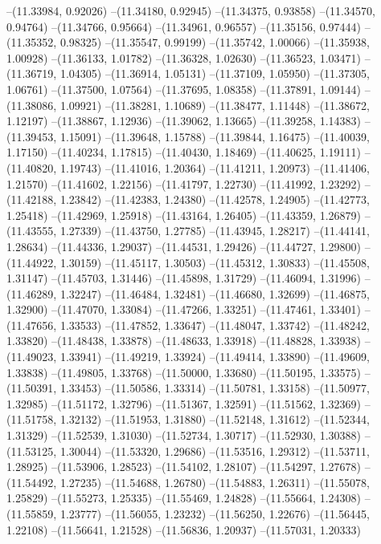 --(11.33984, 0.92026)
--(11.34180, 0.92945)
--(11.34375, 0.93858)
--(11.34570, 0.94764)
--(11.34766, 0.95664)
--(11.34961, 0.96557)
--(11.35156, 0.97444)
--(11.35352, 0.98325)
--(11.35547, 0.99199)
--(11.35742, 1.00066)
--(11.35938, 1.00928)
--(11.36133, 1.01782)
--(11.36328, 1.02630)
--(11.36523, 1.03471)
--(11.36719, 1.04305)
--(11.36914, 1.05131)
--(11.37109, 1.05950)
--(11.37305, 1.06761)
--(11.37500, 1.07564)
--(11.37695, 1.08358)
--(11.37891, 1.09144)
--(11.38086, 1.09921)
--(11.38281, 1.10689)
--(11.38477, 1.11448)
--(11.38672, 1.12197)
--(11.38867, 1.12936)
--(11.39062, 1.13665)
--(11.39258, 1.14383)
--(11.39453, 1.15091)
--(11.39648, 1.15788)
--(11.39844, 1.16475)
--(11.40039, 1.17150)
--(11.40234, 1.17815)
--(11.40430, 1.18469)
--(11.40625, 1.19111)
--(11.40820, 1.19743)
--(11.41016, 1.20364)
--(11.41211, 1.20973)
--(11.41406, 1.21570)
--(11.41602, 1.22156)
--(11.41797, 1.22730)
--(11.41992, 1.23292)
--(11.42188, 1.23842)
--(11.42383, 1.24380)
--(11.42578, 1.24905)
--(11.42773, 1.25418)
--(11.42969, 1.25918)
--(11.43164, 1.26405)
--(11.43359, 1.26879)
--(11.43555, 1.27339)
--(11.43750, 1.27785)
--(11.43945, 1.28217)
--(11.44141, 1.28634)
--(11.44336, 1.29037)
--(11.44531, 1.29426)
--(11.44727, 1.29800)
--(11.44922, 1.30159)
--(11.45117, 1.30503)
--(11.45312, 1.30833)
--(11.45508, 1.31147)
--(11.45703, 1.31446)
--(11.45898, 1.31729)
--(11.46094, 1.31996)
--(11.46289, 1.32247)
--(11.46484, 1.32481)
--(11.46680, 1.32699)
--(11.46875, 1.32900)
--(11.47070, 1.33084)
--(11.47266, 1.33251)
--(11.47461, 1.33401)
--(11.47656, 1.33533)
--(11.47852, 1.33647)
--(11.48047, 1.33742)
--(11.48242, 1.33820)
--(11.48438, 1.33878)
--(11.48633, 1.33918)
--(11.48828, 1.33938)
--(11.49023, 1.33941)
--(11.49219, 1.33924)
--(11.49414, 1.33890)
--(11.49609, 1.33838)
--(11.49805, 1.33768)
--(11.50000, 1.33680)
--(11.50195, 1.33575)
--(11.50391, 1.33453)
--(11.50586, 1.33314)
--(11.50781, 1.33158)
--(11.50977, 1.32985)
--(11.51172, 1.32796)
--(11.51367, 1.32591)
--(11.51562, 1.32369)
--(11.51758, 1.32132)
--(11.51953, 1.31880)
--(11.52148, 1.31612)
--(11.52344, 1.31329)
--(11.52539, 1.31030)
--(11.52734, 1.30717)
--(11.52930, 1.30388)
--(11.53125, 1.30044)
--(11.53320, 1.29686)
--(11.53516, 1.29312)
--(11.53711, 1.28925)
--(11.53906, 1.28523)
--(11.54102, 1.28107)
--(11.54297, 1.27678)
--(11.54492, 1.27235)
--(11.54688, 1.26780)
--(11.54883, 1.26311)
--(11.55078, 1.25829)
--(11.55273, 1.25335)
--(11.55469, 1.24828)
--(11.55664, 1.24308)
--(11.55859, 1.23777)
--(11.56055, 1.23232)
--(11.56250, 1.22676)
--(11.56445, 1.22108)
--(11.56641, 1.21528)
--(11.56836, 1.20937)
--(11.57031, 1.20333)
